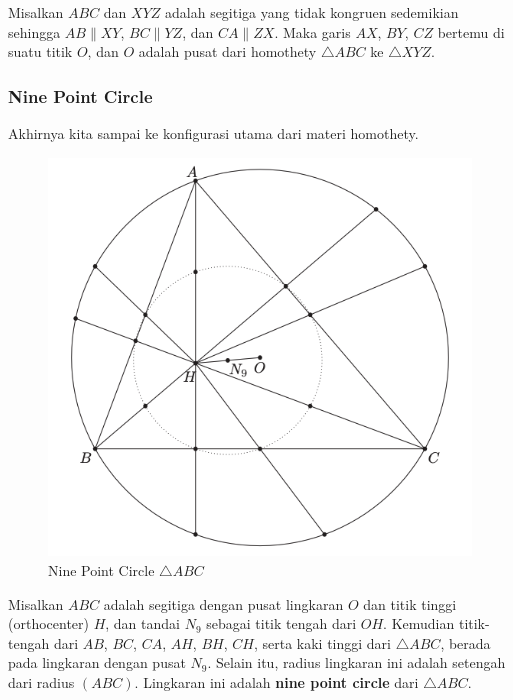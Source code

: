 \documentclass[11pt]{scrartcl}
\begin{document}
\begin{lemma}
    \label{homothetic-triangle}
    Misalkan $ABC$ dan $XYZ$ adalah segitiga yang tidak kongruen sedemikian sehingga $AB \parallel XY$, $BC \parallel YZ$, dan $CA \parallel ZX$. Maka garis $AX$, $BY$, $CZ$ bertemu di suatu titik $O$, dan $O$ adalah pusat dari homothety $\triangle ABC$ ke $\triangle XYZ$.
\end{lemma}
\subsubsection{Nine Point Circle}
Akhirnya kita sampai ke konfigurasi utama dari materi homothety.
\begin{figure}[h]
    \centering
    \includegraphics[scale=0.5]{Geometri/Symmedian-NinePoint/nine-point-circle.png}
    \caption{Nine Point Circle $\triangle ABC$}
    \label{fig:nine-point-circle-figure}
\end{figure}
\begin{lemma}
    \label{nine-point-circle}
    Misalkan $ABC$ adalah segitiga dengan pusat lingkaran $O$ dan titik tinggi (orthocenter) $H$, dan tandai $N_9$ sebagai titik tengah dari $OH$. Kemudian titik-tengah dari $AB$, $BC$, $CA$, $AH$, $BH$, $CH$, serta kaki tinggi dari $\triangle ABC$, berada pada lingkaran dengan pusat $N_9$. Selain itu, radius lingkaran ini adalah setengah dari radius $(ABC)$. Lingkaran ini adalah \textbf{nine point circle} dari $\triangle ABC$.
\end{lemma}
\end{document}
